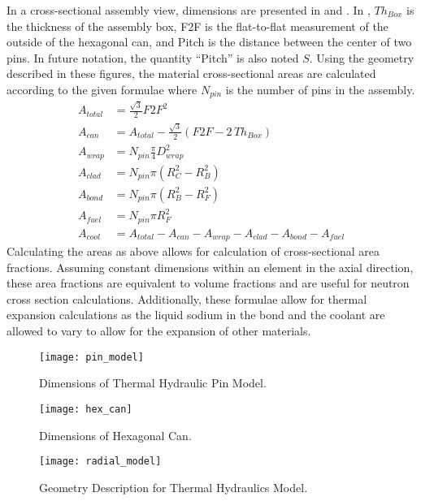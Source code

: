   In a cross-sectional assembly view, dimensions are presented in
   and . In , $Th_{Box}$
  is the thickness of the assembly box, F2F is the flat-to-flat measurement of
  the outside of the hexagonal can, and Pitch is the distance between the
  center of two pins. In future notation, the quantity ``Pitch'' is also noted
  $S$. Using the geometry described in these figures, the material
  cross-sectional areas are calculated according to the given formulae where
  $N_{pin}$ is the number of pins in the assembly.
  \begin{align}
    A_{total} &= \frac{\sqrt{3}}{2} F2F^2 \\
    A_{can} &= A_{total} - \frac{\sqrt{3}}{2} 
      \left(  F2F - 2 \, Th_{Box} \right) \\
    A_{wrap} &= N_{pin} \frac{\pi}{4} D_{wrap}^2 \\
    A_{clad} &= N_{pin} \pi (R_C^2 - R_B^2) \\
    A_{bond} &= N_{pin} \pi (R_B^2 - R_F^2) \\
    A_{fuel} &= N_{pin} \pi R_F^2 \\
    A_{cool} &= A_{total} - A_{can} - A_{wrap} - A_{clad} - A_{bond} - A_{fuel}
  \end{align}
  Calculating the areas as above allows for calculation of cross-sectional area
  fractions. Assuming constant dimensions within an element in the axial
  direction, these area fractions are equivalent to volume fractions and are
  useful for neutron cross section calculations. Additionally, these formulae
  allow for thermal expansion calculations as the liquid sodium in the bond and
  the coolant are allowed to vary to allow for the expansion of other materials.

  \begin{figure}
    \centering
    \texttt{[image: pin\_model]}
    \caption{Dimensions of Thermal Hydraulic Pin Model.}
    \label{fig:pin_model}
  \end{figure}

  \begin{figure}
    \centering
    \texttt{[image: hex\_can]}
    \caption{Dimensions of Hexagonal Can.}
    \label{fig:hex_can}
  \end{figure}
  
  \begin{figure}
    \centering
    \texttt{[image: radial\_model]}
    \caption{Geometry Description for Thermal Hydraulics Model.}
    \label{fig:radial_model}
  \end{figure}

